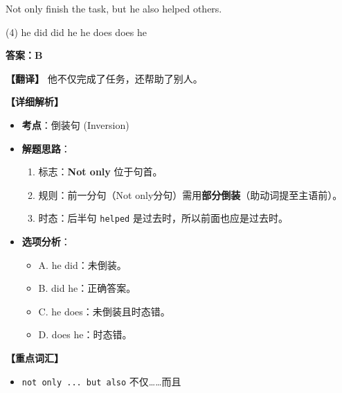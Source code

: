 \documentclass[11pt, a4paper]{article}
\newcommand{\analysis}[4]{
    \begin{solutionbox}
        \textbf{答案：#1}
        
        \textbf{【翻译】} #2
        
        \textbf{【详细解析】}
        #3
        
        \textbf{【重点词汇】}
        #4
    \end{solutionbox}
}
\newcommand{\blank}{\underline{\hspace{1.5cm}}}
\begin{document}
\begin{questions}
    \item Not only \blank finish the task, but he also helped others.
    \begin{tasks}(4)
        \task he did \task did he \task he does \task does he
    \end{tasks}
    \analysis{B}{他不仅完成了任务，还帮助了别人。}{
        \begin{itemize}
            \item \textbf{考点}：倒装句 (Inversion)
            \item \textbf{解题思路}：
                \begin{enumerate}
                    \item 标志：\textbf{Not only} 位于句首。
                    \item 规则：前一分句（Not only分句）需用\textbf{部分倒装}（助动词提至主语前）。
                    \item 时态：后半句 \texttt{helped} 是过去时，所以前面也应是过去时。
                \end{enumerate}
            \item \textbf{选项分析}：
                \begin{itemize}
                    \item A. he did：未倒装。
                    \item B. did he：正确答案。
                    \item C. he does：未倒装且时态错。
                    \item D. does he：时态错。
                \end{itemize}
        \end{itemize}
    }{
        \begin{itemize}
            \item \texttt{not only ... but also} 不仅……而且
        \end{itemize}
    }


\end{questions}
\end{document}
